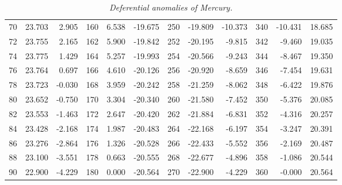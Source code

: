 \begin{table}
{\begin{tabular}{rrr|rrr|rrr|rrr}
 70 &  23.703 &  2.905 & 160 &   6.538 & -19.675 & 250 & -19.809 & -10.373 & 340 & -10.431 & 18.685\\
 72 &  23.755 &  2.165 & 162 &   5.900 & -19.842 & 252 & -20.195 & -9.815 & 342 &  -9.460 & 19.035\\
 74 &  23.775 &  1.429 & 164 &   5.257 & -19.993 & 254 & -20.566 & -9.243 & 344 &  -8.467 & 19.350\\
 76 &  23.764 &  0.697 & 166 &   4.610 & -20.126 & 256 & -20.920 & -8.659 & 346 &  -7.454 & 19.631\\
 78 &  23.723 & -0.030 & 168 &   3.959 & -20.242 & 258 & -21.259 & -8.062 & 348 &  -6.422 & 19.876\\
 80 &  23.652 & -0.750 & 170 &   3.304 & -20.340 & 260 & -21.580 & -7.452 & 350 &  -5.376 & 20.085\\
 82 &  23.553 & -1.463 & 172 &   2.647 & -20.420 & 262 & -21.884 & -6.831 & 352 &  -4.316 & 20.257\\
 84 &  23.428 & -2.168 & 174 &   1.987 & -20.483 & 264 & -22.168 & -6.197 & 354 &  -3.247 & 20.391\\
 86 &  23.276 & -2.864 & 176 &   1.326 & -20.528 & 266 & -22.433 & -5.552 & 356 &  -2.169 & 20.487\\
 88 &  23.100 & -3.551 & 178 &   0.663 & -20.555 & 268 & -22.677 & -4.896 & 358 &  -1.086 & 20.544\\
 90 &  22.900 & -4.229 & 180 &   0.000 & -20.564 & 270 & -22.900 & -4.229 & 360 &  -0.000 & 20.564\\
\end{tabular}}
\caption{\em Deferential anomalies of Mercury.}\label{vt21}
\end{table}

